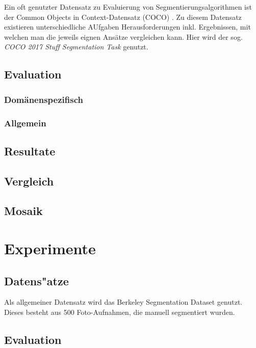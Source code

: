 Ein oft genutzter Datensatz zu Evaluierung von Segmentierungsalgorithmen ist der Common Objects in Context-Datensatz (COCO) \cite{lin_14}. Zu diesem Datensatz existieren unterschiedliche AUfgaben \bzw Herausforderungen inkl. Ergebnissen, mit welchen man die jeweils eignen Ansätze vergleichen kann. Hier wird der sog. \textit{COCO 2017 Stuff Segmentation Task} genutzt.

\section{Evaluation}
\label{sec:evaluation}

\subsection{Domänenspezifisch}

\subsection{Allgemein}

\section{Resultate}
\label{sec:results}

\section{Vergleich}
\label{sec:comparision}

\section{Mosaik}
\label{sec:mosaic}

\iffalse
\chapter{Experimente}
\label{chap:experimente}

\section{Datens"atze}
\label{sec:datensätze}


Als allgemeiner Datensatz wird das Berkeley Segmentation Dataset \cite{bsd500} genutzt. Dieses besteht aus 500 Foto-Aufnahmen, die manuell segmentiert wurden.



\section{Evaluation}
\label{sec:Evaluation}

